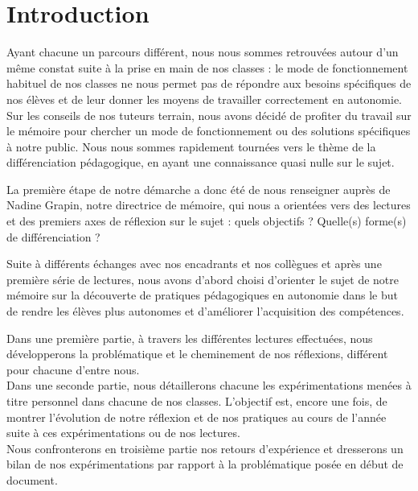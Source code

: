 \section{Introduction} %

Ayant chacune un parcours différent, nous nous sommes retrouvées autour d’un même constat suite à la prise en main de nos classes : le mode de fonctionnement habituel de nos classes ne nous permet pas de répondre aux besoins spécifiques de nos élèves et de leur donner les moyens de travailler correctement en autonomie. Sur les conseils de nos tuteurs terrain, nous avons décidé de profiter du travail sur le mémoire pour chercher un mode de fonctionnement ou des solutions spécifiques à notre public. Nous nous sommes rapidement tournées vers le thème de la différenciation pédagogique, en ayant une connaissance quasi nulle sur le sujet.

La première étape de notre démarche a donc été de nous renseigner auprès de Nadine Grapin, notre directrice de mémoire, qui nous a orientées vers des lectures et des premiers axes de réflexion sur le sujet : quels objectifs ? Quelle(s) forme(s) de différenciation ?

Suite à différents échanges avec nos encadrants et nos collègues et après une première série de lectures, nous avons d'abord choisi d’orienter le sujet de notre mémoire sur la découverte de pratiques pédagogiques en autonomie dans le but de rendre les élèves plus autonomes et d'améliorer l'acquisition des compétences. 

Dans une première partie, à travers les différentes lectures effectuées, nous développerons la problématique et le cheminement de nos réflexions, différent pour chacune d'entre nous. \\
Dans une seconde partie, nous détaillerons chacune les expérimentations menées à titre personnel dans chacune de nos classes. L'objectif est, encore une fois, de montrer l'évolution de notre réflexion et de nos pratiques au cours de l'année suite à ces expérimentations ou de nos lectures.\\
Nous confronterons en troisième partie nos retours d'expérience et dresserons un bilan de nos expérimentations par rapport à la problématique posée en début de document.

